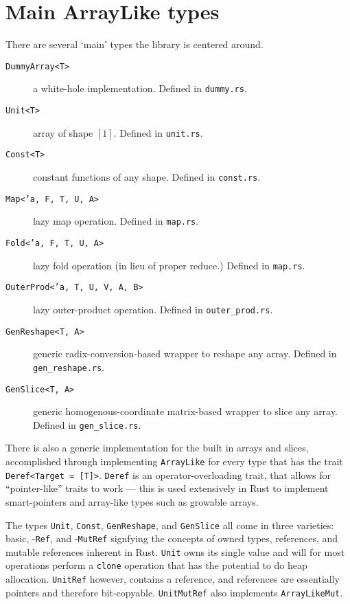 \documentclass{DIKU-report-variant}
\begin{document}
\section{Main ArrayLike types}

There are several `main' types the library is centered around.
\begin{description}
  \item[\texttt{DummyArray<T>}] a white-hole implementation. Defined in \texttt{dummy.rs}.
  \item[\texttt{Unit<T>}] array of shape \([1]\). Defined in \texttt{unit.rs}.
  \item[\texttt{Const<T>}] constant functions of any shape. Defined in \texttt{const.rs}.
  \item[\texttt{Map<'a, F, T, U, A>}] lazy map operation. Defined in \texttt{map.rs}.
  \item[\texttt{Fold<'a, F, T, U, A>}] lazy fold operation (in lieu of proper reduce.) Defined in \texttt{map.rs}.
  \item[\texttt{OuterProd<'a, T, U, V, A, B>}] lazy outer-product operation. Defined in \texttt{outer\_prod.rs}.
  \item[\texttt{GenReshape<T, A>}] generic radix-conversion-based wrapper to reshape any array. Defined in \texttt{gen\_reshape.rs}.
  \item[\texttt{GenSlice<T, A>}] generic homogenous-coordinate matrix-based wrapper to slice any array. Defined in \texttt{gen\_slice.rs}.
\end{description}

There is also a generic implementation for the built in arrays and slices, accomplished through
implementing \texttt{ArrayLike} for every type that has the trait \texttt{Deref<Target = [T]>}.
\texttt{Deref} is an operator-overloading trait, that allows for ``pointer-like'' traits to
work --- this is used extensively in Rust to implement smart-pointers and array-like types such
as growable arrays.

The types \texttt{Unit}, \texttt{Const}, \texttt{GenReshape}, and \texttt{GenSlice} all come in
three varieties: basic, -\texttt{Ref}, and -\texttt{MutRef} signfying the concepts of owned types,
references, and mutable references inherent in Rust. \texttt{Unit} owns its single value and will
for most operations  perform a \texttt{clone} operation that has the potential to do heap allocation.
\texttt{UnitRef} however, contains a reference, and references are essentially pointers and therefore
bit-copyable. \texttt{UnitMutRef} also implements \texttt{ArrayLikeMut}.
\end{document}

